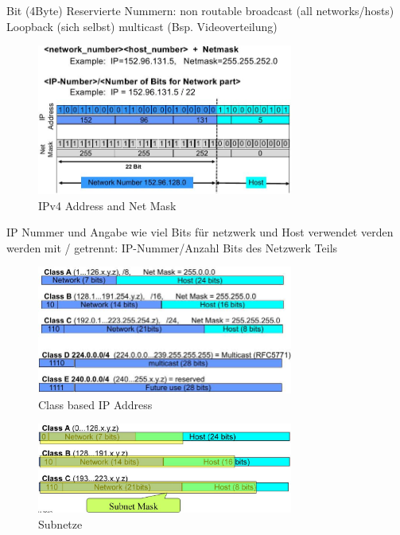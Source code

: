 \documentclass[ngerman,a4paper,12pt]{scrreprt}
\begin{document}

\ul
	 Bit (4Byte)
	\li Reservierte Nummern:
		\ul
			\li non routable
			\li broadcast (all networks/hosts)
			\li Loopback (sich selbst)
			\li multicast (Bsp. Videoverteilung)
		\ulE
\ulE

\begin{figure}[H]
	\centering
	\includegraphics[width=0.75\textwidth]{img/V9.1.jpg}
	\caption{IPv4 Address and Net Mask}
	\label{}
\end{figure}

\ul
	\li IP Nummer und Angabe wie viel Bits für netzwerk und Host verwendet verden werden mit / getrennt: IP-Nummer/Anzahl Bits des Netzwerk Teils
\ulE

\begin{figure}[H]
	\centering
	\includegraphics[width=0.75\textwidth]{img/V9.2.jpg}
	\caption{Class based IP Address}
	\label{}
\end{figure}

\begin{figure}[H]
	\centering
	\includegraphics[width=0.75\textwidth]{img/V9.3.jpg}
	\caption{Subnetze}
	\label{}
\end{figure}
\end{document}
